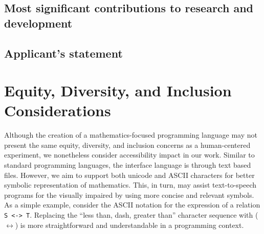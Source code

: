 \documentclass[12pt]{article}
\begin{document}
\subsection{Most significant contributions to research and development}
\subsection{Applicant's statement}

\pagebreak
\section{Equity, Diversity, and Inclusion Considerations}
Although the creation of a mathematics-focused programming language may not present the same equity, diversity, and inclusion concerns as a human-centered experiment, we nonetheless consider accessibility impact in our work. Similar to standard programming languages, the interface language is through text based files. However, we aim to support both unicode and ASCII characters for better symbolic representation of mathematics. This, in turn, may assist text-to-speech programs for the visually impaired by using more concise and relevant symbols. As a simple example, consider the ASCII notation for the expression of a relation \texttt{S <-> T}. Replacing the ``less than, dash, greater than'' character sequence with ($\leftrightarrow$) is more straightforward and understandable in a programming context.

\pagebreak
\nocite{*} %
\printbibliography[notcategory=fullcited] %
\end{document}

